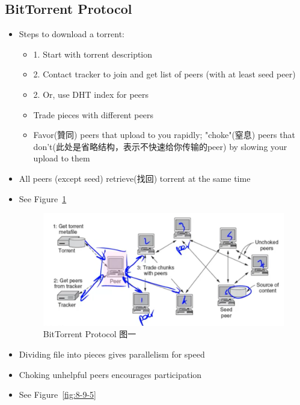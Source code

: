 \documentclass[12pt]{ctexart}   %
\begin{document}
	\subsection{BitTorrent Protocol}
	\begin{itemize}
		\item Steps to download a torrent:
		\begin{itemize}
			\item {\color{blue} 1.} Start with torrent description
			\item {\color{blue} 2.} Contact tracker to join and get list of peers (with at least seed peer)
			\item {\color{blue} 2.}  Or, use DHT index for peers
			\item Trade pieces with different peers
			\item Favor(贊同) peers that upload to you rapidly; "choke"(窒息) peers that don't(此处是省略结构，表示不快速给你传输的peer) by slowing your upload to them
		\end{itemize}
		
		\item All peers (except seed) retrieve(找回) torrent at the same time
		\item See Figure~\ref{fig:8-9-4}
		  
		 \begin{figure}[h!] %
		\centering
		 \includegraphics[scale=0.7]{images/8-9-4}
		\caption{ BitTorrent Protocol 图一 }
		 \label{fig:8-9-4}
		 \end{figure}
		 
		 \item Dividing file into pieces gives parallelism for speed
		 \item Choking unhelpful peers encourages participation
		 \item See Figure~\ref{fig:8-9-5}
		  

\end{itemize}
\end{document}
